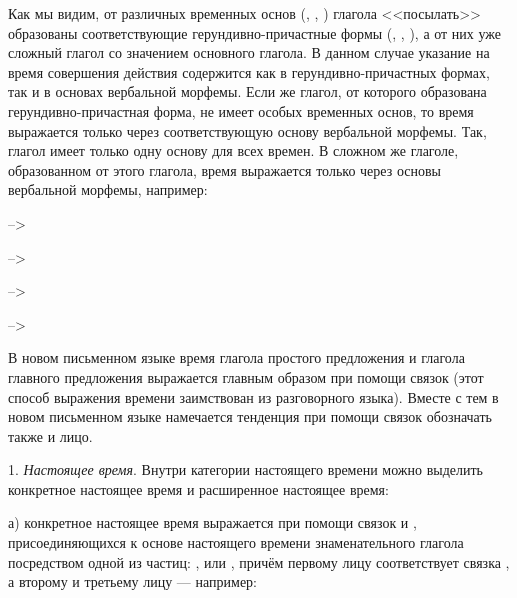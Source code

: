 Как мы видим, от различных временных основ (, , ) глагола <<посылать>> образованы соответствующие герундивно-причастные формы (, , ), а от них уже сложный глагол со значением основного глагола. В данном случае указание на время совершения действия содержится как в герундивно-причастных формах, так и в основах вербальной морфемы. Если же глагол, от которого образована герундивно-причастная форма, не имеет особых временных основ, то время выражается только через соответствующую основу вербальной морфемы. Так, глагол
 имеет только одну основу для всех времен. В сложном же глаголе, образованном от этого глагола, время выражается только через основы вербальной морфемы, например:

\begin{description}
	\item{}-->
	\item-->
	\item-->
	\item-->
\end{description}

В новом письменном языке время глагола простого предложения и глагола главного предложения выражается главным образом при помощи связок (этот способ выражения
времени заимствован из разговорного языка). Вместе с тем в новом письменном языке намечается тенденция при помощи связок обозначать также и лицо.

1. \emph{Настоящее время}. Внутри категории настоящего времени можно выделить конкретное настоящее время и расширенное настоящее время:

а) конкретное настоящее время выражается при помощи связок  и , присоединяющихся к основе настоящего времени знаменательного глагола посредством одной из частиц: ,  или , причём первому лицу соответствует связка , а второму и третьему лицу ---  например:

\begin{description}
	\item{}
	\item{}
	\item{}
\end{description}

